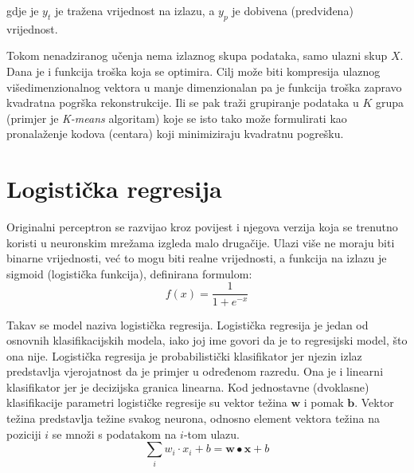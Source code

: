 \documentclass[times, utf8, diplomski, numeric]{fer}
\begin{document}
gdje je $y_t$ je tražena vrijednost na izlazu, a $y_p$ je dobivena (predviđena) vrijednost.

Tokom nenadziranog učenja nema izlaznog skupa podataka, samo ulazni skup $X$. Dana je i funkcija troška koja se optimira.
Cilj može biti kompresija ulaznog višedimenzionalnog vektora u manje dimenzionalan pa je funkcija troška zapravo kvadratna pogrška rekonstrukcije. Ili se pak traži grupiranje podataka u $K$ grupa (primjer je \textit{K-means} algoritam\cite{Hartigan-1979}) koje se isto tako može formulirati kao pronalaženje kodova (centara) koji minimiziraju kvadratnu pogrešku.


\section{Logistička regresija}
\label{chap:logisticka_regresija}

Originalni perceptron se razvijao kroz povijest i njegova verzija koja se trenutno koristi u neuronskim mrežama izgleda malo drugačije. Ulazi više ne moraju biti binarne vrijednosti, već to mogu biti realne vrijednosti, a funkcija na izlazu je sigmoid (logistička funkcija), definirana formulom:
\begin{equation}
f(x) = \frac{1}{1+e^{-x}}
\end{equation}

Takav se model naziva logistička regresija. Logistička regresija je jedan od osnovnih klasifikacijskih modela, iako joj ime govori da je to regresijski model, što ona nije.
Logistička regresija je probabilistički klasifikator jer njezin izlaz predstavlja vjerojatnost da je primjer u određenom razredu.\cite{strojno_snajder}
Ona je i linearni klasifikator jer je decizijska granica linearna.
Kod jednostavne (dvoklasne) klasifikacije parametri logističke regresije su vektor težina $\boldsymbol{w}$ i pomak $\boldsymbol{b}$. Vektor težina predstavlja težine svakog neurona, odnosno element vektora težina na poziciji $i$ se množi s podatakom na $i$-tom ulazu.
\begin{equation}
  \sum_i w_i \cdot x_i + b = \boldsymbol{w} \bullet \boldsymbol{x} + b
\end{equation}
\end{document}
